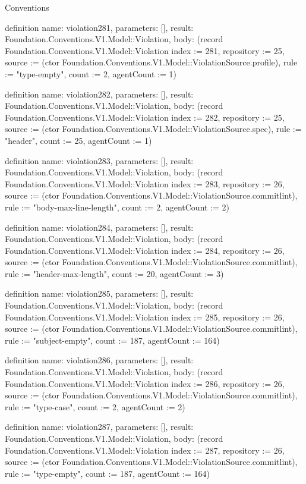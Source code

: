 \begin{lexlean}{Conventions}
\begin{semanticmodule}
definition{
  name: violation281,
  parameters: [],
  result: Foundation.Conventions.V1.Model::Violation,
  body: (record Foundation.Conventions.V1.Model::Violation {index := 281, repository := 25, source := (ctor Foundation.Conventions.V1.Model::ViolationSource.profile), rule := "type-empty", count := 2, agentCount := 1})
}

definition{
  name: violation282,
  parameters: [],
  result: Foundation.Conventions.V1.Model::Violation,
  body: (record Foundation.Conventions.V1.Model::Violation {index := 282, repository := 25, source := (ctor Foundation.Conventions.V1.Model::ViolationSource.spec), rule := "header", count := 25, agentCount := 1})
}

definition{
  name: violation283,
  parameters: [],
  result: Foundation.Conventions.V1.Model::Violation,
  body: (record Foundation.Conventions.V1.Model::Violation {index := 283, repository := 26, source := (ctor Foundation.Conventions.V1.Model::ViolationSource.commitlint), rule := "body-max-line-length", count := 2, agentCount := 2})
}

definition{
  name: violation284,
  parameters: [],
  result: Foundation.Conventions.V1.Model::Violation,
  body: (record Foundation.Conventions.V1.Model::Violation {index := 284, repository := 26, source := (ctor Foundation.Conventions.V1.Model::ViolationSource.commitlint), rule := "header-max-length", count := 20, agentCount := 3})
}

definition{
  name: violation285,
  parameters: [],
  result: Foundation.Conventions.V1.Model::Violation,
  body: (record Foundation.Conventions.V1.Model::Violation {index := 285, repository := 26, source := (ctor Foundation.Conventions.V1.Model::ViolationSource.commitlint), rule := "subject-empty", count := 187, agentCount := 164})
}

definition{
  name: violation286,
  parameters: [],
  result: Foundation.Conventions.V1.Model::Violation,
  body: (record Foundation.Conventions.V1.Model::Violation {index := 286, repository := 26, source := (ctor Foundation.Conventions.V1.Model::ViolationSource.commitlint), rule := "type-case", count := 2, agentCount := 2})
}

definition{
  name: violation287,
  parameters: [],
  result: Foundation.Conventions.V1.Model::Violation,
  body: (record Foundation.Conventions.V1.Model::Violation {index := 287, repository := 26, source := (ctor Foundation.Conventions.V1.Model::ViolationSource.commitlint), rule := "type-empty", count := 187, agentCount := 164})
}


\end{semanticmodule}
\end{lexlean}
